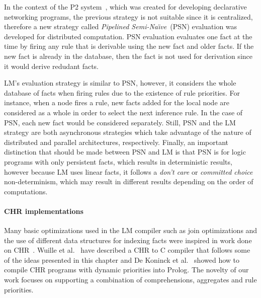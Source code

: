 In the context of the P2 system~\cite{Loo-condie-garofalakis-p2}, which was
created for developing declarative networking programs, the previous strategy is
not suitable since it is centralized, therefore a new strategy called
\emph{Pipelined Semi-Na\"{\i}ve}~(PSN) evaluation was developed for distributed
computation. PSN evaluation evaluates one fact at the time by firing any rule
that is derivable using the new fact and older facts. If the new fact is already
in the database, then the fact is not used for derivation since it would derive
redudant facts.

 LM's evaluation strategy is similar to PSN, however, it considers the whole
 database of facts when firing rules due to the existence of rule priorities.
 For instance, when a node fires a rule, new facts added for the local node are
 considered as a whole in order to select the next inference rule. In the case
 of PSN, each new fact would be considered separately. Still, PSN and the LM
 strategy are both asynchronous strategies which take advantage of the nature of
 distributed and parallel architectures, respectively. Finally, an important
 distinction that should be made between PSN and LM is that PSN is for logic
 programs with only persistent facts, which results in deterministic results,
 however because LM uses linear facts, it follows a \emph{don't care} or
 \emph{committed choice} non-determinism, which may result in different results
 depending on the order of computations.

\paragraph{CHR implementations} Many basic optimizations used in the LM compiler
such as join optimizations and the use of different data structures for indexing
facts were inspired in work done on CHR~\cite{DBLP:journals/corr/cs-PL-0408025}.
Wuille et al.~\cite{42866} have described a CHR to C compiler that follows some
of the ideas presented in this chapter and De Koninck et al.~\cite{chrp} showed
how to compile CHR programs with dynamic priorities into Prolog. The novelty of
our work focuses on supporting a combination of comprehensions, aggregates and
rule priorities.

